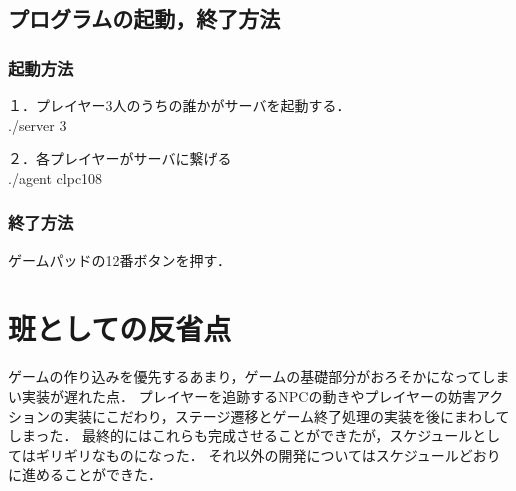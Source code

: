 \documentclass{jarticle}
\begin{document}
\subsection{プログラムの起動，終了方法}
\subsubsection{起動方法}
１．プレイヤー3人のうちの誰かがサーバを起動する．\\
./server 3

２．各プレイヤーがサーバに繋げる \\
./agent clpc108

\subsubsection{終了方法}
ゲームパッドの12番ボタンを押す．


\section{班としての反省点} %
ゲームの作り込みを優先するあまり，ゲームの基礎部分がおろそかになってしまい実装が遅れた点．
プレイヤーを追跡するNPCの動きやプレイヤーの妨害アクションの実装にこだわり，ステージ遷移とゲーム終了処理の実装を後にまわしてしまった．
最終的にはこれらも完成させることができたが，スケジュールとしてはギリギリなものになった．
それ以外の開発についてはスケジュールどおりに進めることができた．
\end{document}
